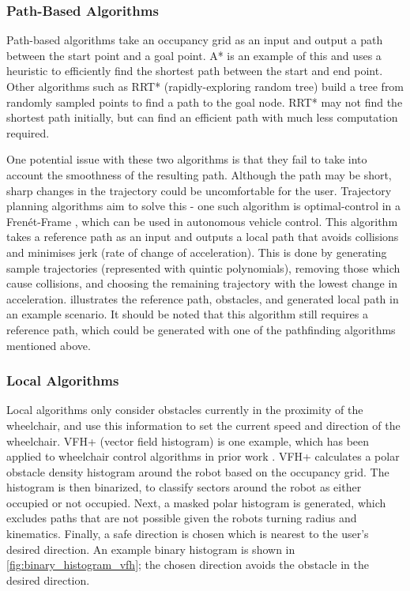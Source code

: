 \subsubsection{Path-Based Algorithms}
Path-based algorithms take an occupancy grid as an input and output a path between the start point and a goal point.
A* is an example of this and uses a heuristic to efficiently find the shortest path between the start and end point.
Other algorithms such as RRT* (rapidly-exploring random tree) \cite{karamanSamplingbasedAlgorithmsOptimal2011} build a tree from randomly sampled points
to find a path to the goal node. RRT* may not find the shortest path initially, but can find an efficient path with much less
computation required.

One potential issue with these two algorithms is that they fail to take into account the smoothness of the resulting path.
Although the path may be short, sharp changes in the trajectory could be uncomfortable for the user.
Trajectory planning algorithms aim to solve this - one such algorithm is optimal-control in a Fren\'et-Frame \cite{werlingOptimalTrajectoryGeneration2010},
which can be used in autonomous vehicle control.
This algorithm takes a reference path as an input and outputs a local path that avoids collisions and minimises jerk (rate of change of acceleration).
This is done by generating sample trajectories (represented with quintic polynomials), removing those which cause collisions, and choosing
the remaining trajectory with the lowest change in acceleration.  illustrates the reference path, obstacles, and generated
local path in an example scenario.
It should be noted that this algorithm still requires a reference path, which could be generated
with one of the pathfinding algorithms mentioned above.

\subsubsection{Local Algorithms}
Local algorithms only consider obstacles currently in the proximity of the wheelchair,
and use this information to set the current speed and direction of the wheelchair.
VFH+ (vector field histogram) \cite{ulrichVFHReliableObstacle1998} is one example, which
has been applied to wheelchair control algorithms in prior work \cite{tomariEnhancingWheelchairControl2014}.
VFH+ calculates a polar obstacle density histogram around the robot based on the occupancy grid.
The histogram is then binarized, to classify sectors around the robot as either occupied or not occupied.
Next, a masked polar histogram is generated, which excludes paths that are not possible given the robots
turning radius and kinematics. Finally, a safe direction is chosen which is nearest to the user's desired direction.
An example binary histogram is shown in \cref{fig:binary_histogram_vfh}; the chosen direction avoids the obstacle in the
desired direction.

